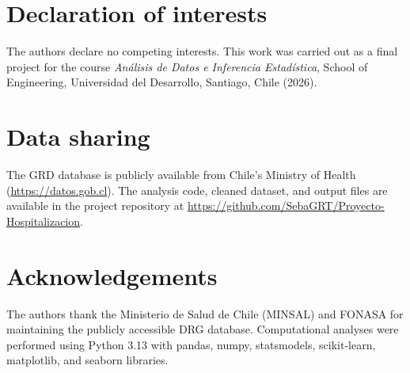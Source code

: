 \documentclass[10pt,twocolumn]{article}
\begin{document}
\section*{Declaration of interests}
The authors declare no competing interests. This work was carried out as a
final project for the course \textit{Análisis de Datos e Inferencia Estadística},
School of Engineering, Universidad del Desarrollo, Santiago, Chile (2026).

\section*{Data sharing}
The GRD database is publicly available from Chile's Ministry of Health
(\url{https://datos.gob.cl}). The analysis code, cleaned dataset, and output files
are available in the project repository at
\url{https://github.com/SebaGRT/Proyecto-Hospitalizacion}.

\section*{Acknowledgements}
The authors thank the Ministerio de Salud de Chile (MINSAL) and FONASA for
maintaining the publicly accessible DRG database. Computational analyses were
performed using Python 3.13 with pandas, numpy, statsmodels, scikit-learn,
matplotlib, and seaborn libraries.

\end{document}
